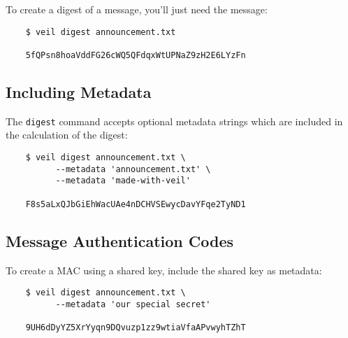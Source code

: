 \documentclass{scrartcl}
\begin{document}
To create a digest of a message, you'll just need the message:

\begin{verbatim}
    $ veil digest announcement.txt

    5fQPsn8hoaVddFG26cWQ5QFdqxWtUPNaZ9zH2E6LYzFn
    \end{verbatim}

\subsection{Including Metadata}\label{subsec:including-metadata}

The \texttt{digest} command accepts optional metadata strings which are included in the calculation of the digest:

\begin{verbatim}
    $ veil digest announcement.txt \
          --metadata 'announcement.txt' \
          --metadata 'made-with-veil'

    F8s5aLxQJbGiEhWacUAe4nDCHVSEwycDavYFqe2TyND1
    \end{verbatim}

\subsection{Message Authentication Codes}\label{subsec:message-authentication-codes}

To create a MAC using a shared key, include the shared key as metadata:

\begin{verbatim}
    $ veil digest announcement.txt \
          --metadata 'our special secret'

    9UH6dDyYZ5XrYyqn9DQvuzp1zz9wtiaVfaAPvwyhTZhT
    \end{verbatim}
\end{document}
